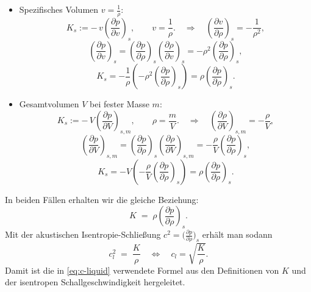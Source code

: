 \begin{itemize}
    \item Spezifisches Volumen $v = \frac{1}{\rho}$:
    \[
    K_s := -\,v\left(\frac{\partial p}{\partial v}\right)_{s},\qquad v=\frac{1}{\rho}.
    \quad\Rightarrow\quad
    \left(\frac{\partial v}{\partial \rho}\right)_{s} = -\frac{1}{\rho^2},
    \]
    \[
    \left(\frac{\partial p}{\partial v}\right)_{s}
    = \left(\frac{\partial p}{\partial \rho}\right)_{s}\left(\frac{\partial \rho}{\partial v}\right)_{s}
    = -\rho^2\left(\frac{\partial p}{\partial \rho}\right)_{s},
    \]
    \[
    K_s = -\frac{1}{\rho}\left(-\rho^2\left(\frac{\partial p}{\partial \rho}\right)_{s}\right)
    = \rho\left(\frac{\partial p}{\partial \rho}\right)_{s}.
    \]

\item Gesamtvolumen $V$ bei fester Masse $m$:
    \[
    K_s := -\,V\left(\frac{\partial p}{\partial V}\right)_{s,m},\qquad \rho=\frac{m}{V}.
    \quad\Rightarrow\quad
    \left(\frac{\partial \rho}{\partial V}\right)_{s,m} = -\frac{\rho}{V},
    \]
    \[
    \left(\frac{\partial p}{\partial V}\right)_{s,m}
    = \left(\frac{\partial p}{\partial \rho}\right)_{s}\left(\frac{\partial \rho}{\partial V}\right)_{s,m}
    = -\frac{\rho}{V}\left(\frac{\partial p}{\partial \rho}\right)_{s},
    \]
    \[
    K_s = -V\left(-\frac{\rho}{V}\left(\frac{\partial p}{\partial \rho}\right)_{s}\right)
    = \rho\left(\frac{\partial p}{\partial \rho}\right)_{s}.
    \]
\end{itemize}
In beiden Fällen erhalten wir die gleiche Beziehung:
\begin{equation}
    K \;=\; \rho\left(\frac{\partial p}{\partial \rho}\right)_{s}.
\end{equation}
Mit der akustischen Isentropie-Schließung $c^2=\big(\frac{\partial p}{\partial \rho}\big)_s$
erhält man sodann
\begin{equation}
    c_l^2 \;=\; \frac{K}{\rho} \quad \Leftrightarrow \quad c_l=\sqrt{\frac{K}{\rho}}.
\end{equation}
Damit ist die in \eqref{eq:c-liquid} verwendete Formel aus den Definitionen von $K$
und der isentropen Schallgeschwindigkeit hergeleitet.

